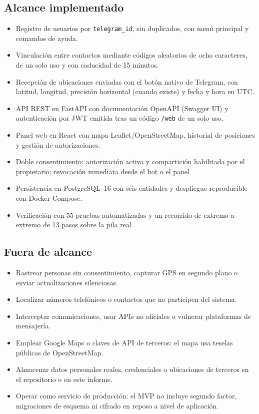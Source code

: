\subsection{Alcance implementado}

\begin{itemize}[leftmargin=*, topsep=2pt, itemsep=2pt]
	\item Registro de usuarios por \texttt{telegram\_id}, sin duplicados, con menú principal y comandos de ayuda.
	\item Vinculación entre contactos mediante códigos aleatorios de ocho caracteres, de un solo uso y con caducidad de 15 minutos.
	\item Recepción de ubicaciones enviadas con el botón nativo de Telegram, con latitud, longitud, precisión horizontal (cuando existe) y fecha y hora en UTC.
	\item API REST en FastAPI con documentación OpenAPI (Swagger UI) y autenticación por JWT emitida tras un código \texttt{/web} de un solo uso.
	\item Panel web en React con mapa Leaflet/OpenStreetMap, historial de posiciones y gestión de autorizaciones.
	\item Doble consentimiento: autorización activa y compartición habilitada por el propietario; revocación inmediata desde el bot o el panel.
	\item Persistencia en PostgreSQL~16 con seis entidades y despliegue reproducible con Docker Compose.
	\item Verificación con 55 pruebas automatizadas y un recorrido de extremo a extremo de 13 pasos sobre la pila real.
\end{itemize}

\subsection{Fuera de alcance}

\begin{itemize}[leftmargin=*, topsep=2pt, itemsep=2pt]
	\item Rastrear personas sin consentimiento, capturar GPS en segundo plano o enviar actualizaciones silenciosas.
	\item Localizar números telefónicos o contactos que no participen del sistema.
	\item Interceptar comunicaciones, usar APIs no oficiales o vulnerar plataformas de mensajería.
	\item Emplear Google Maps o claves de API de terceros: el mapa usa teselas públicas de OpenStreetMap.
	\item Almacenar datos personales reales, credenciales o ubicaciones de terceros en el repositorio o en este informe.
	\item Operar como servicio de producción: el MVP no incluye segundo factor, migraciones de esquema ni cifrado en reposo a nivel de aplicación.
\end{itemize}

